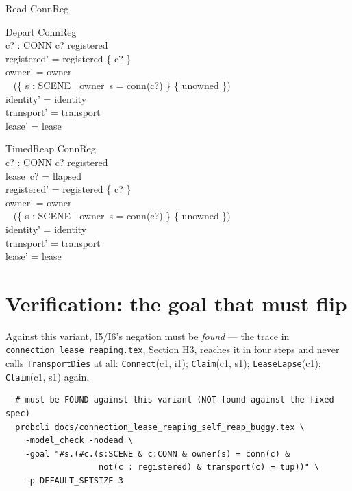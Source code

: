 \documentclass[a4paper,10pt,fleqn]{article}
\begin{document}
\begin{schema}{Read}
  \Xi ConnReg
\end{schema}

\begin{schema}{Depart}
  \Delta ConnReg \\
  c? : CONN
\where
  c? \in registered \\
  registered' = registered \setminus \{ c? \} \\
  owner' = owner \oplus \\
  \quad~ (\{ s : SCENE | owner~s = conn(c?) \} \cross \{ unowned \}) \\
  identity' = identity \\
  transport' = transport \\
  lease' = lease
\end{schema}

\begin{schema}{TimedReap}
  \Delta ConnReg \\
  c? : CONN
\where
  c? \in registered \\
  lease~c? = llapsed \\
  registered' = registered \setminus \{ c? \} \\
  owner' = owner \oplus \\
  \quad~ (\{ s : SCENE | owner~s = conn(c?) \} \cross \{ unowned \}) \\
  identity' = identity \\
  transport' = transport \\
  lease' = lease
\end{schema}

\section{Verification: the goal that must flip}

Against this variant, I5/I6's negation must be \emph{found} --- the
trace in \texttt{connection\_lease\_reaping.tex}, Section H3, reaches it
in four steps and never calls \texttt{TransportDies} at all:
\texttt{Connect}(c1, i1); \texttt{Claim}(c1, s1); \texttt{LeaseLapse}(c1);
\texttt{Claim}(c1, s1) again.

\begin{verbatim}
  # must be FOUND against this variant (NOT found against the fixed spec)
  probcli docs/connection_lease_reaping_self_reap_buggy.tex \
    -model_check -nodead \
    -goal "#s.(#c.(s:SCENE & c:CONN & owner(s) = conn(c) &
                   not(c : registered) & transport(c) = tup))" \
    -p DEFAULT_SETSIZE 3
\end{verbatim}
\end{document}
